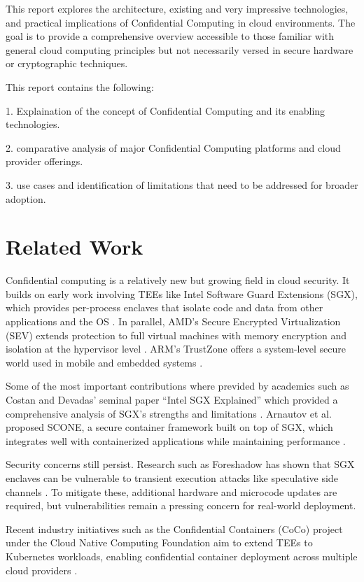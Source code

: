 \documentclass[conference]{IEEEtran}
\begin{document}
This report explores the architecture, existing and very impressive technologies, and practical 
implications of Confidential Computing in cloud environments. The goal is to provide a comprehensive 
overview accessible to those familiar with general cloud computing principles but not necessarily 
versed in secure hardware or cryptographic techniques.

This report contains the following:

1. Explaination of the concept of Confidential Computing and its enabling technologies.

2. comparative analysis of major Confidential Computing platforms and cloud provider offerings.

3. use cases and identification of limitations that need to be addressed for broader adoption.

\section{Related Work}
Confidential computing is a relatively new but growing field in cloud security. 
It builds on early work involving TEEs like Intel Software Guard Extensions (SGX), 
which provides per-process enclaves that isolate code and data from other applications and the OS 
\cite{intelSGX}. In parallel, AMD's Secure Encrypted Virtualization (SEV) extends protection to 
full virtual machines with memory encryption and isolation at the hypervisor level \cite{amdSEV}. 
ARM's TrustZone offers a system-level secure world used in mobile and embedded systems 
\cite{armTrustZone}.

Some of the most important contributions where previded by academics such as Costan and Devadas’ 
seminal paper “Intel SGX Explained” which provided a 
comprehensive analysis of SGX's strengths and limitations \cite{costan2016intel}. Arnautov et al. 
proposed SCONE, a secure container framework built on top of SGX, which integrates well with 
containerized applications while maintaining performance \cite{arnautov2016scone}.

Security concerns still persist. Research such as Foreshadow has shown that SGX enclaves can be 
vulnerable to transient execution attacks like speculative side channels \cite{van2018foreshadow}. 
To mitigate these, additional hardware and microcode updates are required, but vulnerabilities 
remain 
a pressing concern for real-world deployment.

Recent industry initiatives such as the Confidential Containers (CoCo) project under the Cloud 
Native Computing Foundation aim to extend TEEs to Kubernetes workloads, enabling confidential 
container deployment across multiple cloud providers \cite{coco}.
\end{document}
